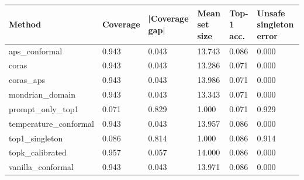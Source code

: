 \begin{tabular}{llllll}
\toprule
Method & Coverage & |Coverage gap| & Mean set size & Top-1 acc. & Unsafe singleton error \\
\midrule
aps\_conformal & 0.943 & 0.043 & 13.743 & 0.086 & 0.000 \\
coras & 0.943 & 0.043 & 13.286 & 0.071 & 0.000 \\
coras\_aps & 0.943 & 0.043 & 13.986 & 0.071 & 0.000 \\
mondrian\_domain & 0.943 & 0.043 & 13.343 & 0.071 & 0.000 \\
prompt\_only\_top1 & 0.071 & 0.829 & 1.000 & 0.071 & 0.929 \\
temperature\_conformal & 0.943 & 0.043 & 13.957 & 0.086 & 0.000 \\
top1\_singleton & 0.086 & 0.814 & 1.000 & 0.086 & 0.914 \\
topk\_calibrated & 0.957 & 0.057 & 14.000 & 0.086 & 0.000 \\
vanilla\_conformal & 0.943 & 0.043 & 13.971 & 0.086 & 0.000 \\
\bottomrule
\end{tabular}
